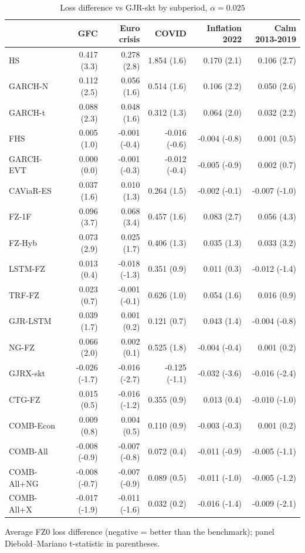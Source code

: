 \begin{table}[htbp]
\centering
\footnotesize
\caption{Loss difference vs GJR-skt by subperiod, $\alpha=0.025$}
\label{tab:sub}
\begin{tabular}{lrrrrr}
\toprule
 & GFC & Euro crisis & COVID & Inflation 2022 & Calm 2013-2019 \\
\midrule
HS & 0.417 (3.3) & 0.278 (2.8) & 1.854 (1.6) & 0.170 (2.1) & 0.106 (2.7) \\
GARCH-N & 0.112 (2.5) & 0.056 (1.6) & 0.514 (1.6) & 0.106 (2.2) & 0.050 (2.6) \\
GARCH-t & 0.088 (2.3) & 0.048 (1.6) & 0.312 (1.3) & 0.064 (2.0) & 0.032 (2.2) \\
FHS & 0.005 (1.0) & -0.001 (-0.4) & -0.016 (-0.6) & -0.004 (-0.8) & 0.001 (0.5) \\
GARCH-EVT & 0.000 (0.0) & -0.001 (-0.3) & -0.012 (-0.4) & -0.005 (-0.9) & 0.002 (0.7) \\
CAViaR-ES & 0.037 (1.6) & 0.010 (1.3) & 0.264 (1.5) & -0.002 (-0.1) & -0.007 (-1.0) \\
FZ-1F & 0.096 (3.7) & 0.068 (3.4) & 0.457 (1.6) & 0.083 (2.7) & 0.056 (4.3) \\
FZ-Hyb & 0.073 (2.9) & 0.025 (1.7) & 0.406 (1.3) & 0.035 (1.3) & 0.033 (3.2) \\
LSTM-FZ & 0.013 (0.4) & -0.018 (-1.3) & 0.351 (0.9) & 0.011 (0.3) & -0.012 (-1.4) \\
TRF-FZ & 0.023 (0.7) & -0.001 (-0.1) & 0.626 (1.0) & 0.054 (1.6) & 0.016 (0.9) \\
GJR-LSTM & 0.039 (1.7) & 0.001 (0.2) & 0.121 (0.7) & 0.043 (1.4) & -0.004 (-0.8) \\
NG-FZ & 0.066 (2.0) & 0.002 (0.1) & 0.525 (1.8) & -0.004 (-0.4) & 0.001 (0.2) \\
GJRX-skt & -0.026 (-1.7) & -0.016 (-2.7) & -0.125 (-1.1) & -0.032 (-3.6) & -0.016 (-2.4) \\
CTG-FZ & 0.015 (0.5) & -0.016 (-1.2) & 0.355 (0.9) & 0.013 (0.4) & -0.010 (-1.0) \\
COMB-Econ & 0.009 (0.8) & 0.004 (0.5) & 0.110 (0.9) & -0.003 (-0.3) & 0.001 (0.2) \\
COMB-All & -0.008 (-0.9) & -0.007 (-0.8) & 0.072 (0.4) & -0.011 (-0.9) & -0.005 (-1.1) \\
COMB-All+NG & -0.008 (-0.7) & -0.007 (-0.9) & 0.089 (0.5) & -0.011 (-1.0) & -0.005 (-1.2) \\
COMB-All+X & -0.017 (-1.9) & -0.011 (-1.6) & 0.032 (0.2) & -0.016 (-1.4) & -0.009 (-2.1) \\
\bottomrule
\end{tabular}
\par\smallskip\parbox{\linewidth}{\scriptsize Average FZ0 loss difference (negative = better than the benchmark); panel Diebold--Mariano t-statistic in parentheses.}
\end{table}